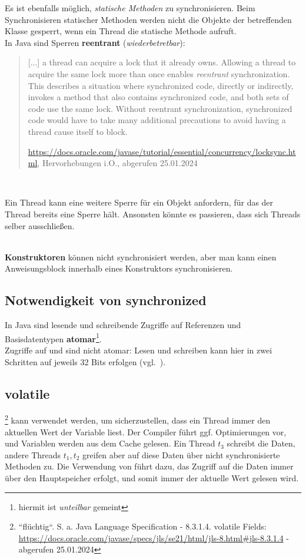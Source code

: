 Es ist ebenfalls möglich, \textit{statische Methoden} zu synchronisieren.
Beim Synchronisieren statischer Methoden werden nicht die Objekte der betreffenden Klasse gesperrt, wenn ein Thread die statische Methode aufruft.\\

In Java sind Sperren \textbf{reentrant} (\textit{wiederbetretbar}):

\blockquote[\url{https://docs.oracle.com/javase/tutorial/essential/concurrency/locksync.html}, Hervorhebungen i.O., abgerufen 25.01.2024]{
     [...] a thread can acquire a lock that it already owns. Allowing a thread to acquire the same lock more than once enables \textit{reentrant} synchronization. This describes a situation where synchronized code, directly or indirectly, invokes a method that also contains synchronized code, and both sets of code use the same lock. Without reentrant synchronization, synchronized code would have to take many additional precautions to avoid having a thread cause itself to block.
}\\

\begin{tcolorbox}
    Ein Thread kann eine weitere Sperre für ein Objekt anfordern, für das der Thread bereits eine Sperre hält.
    Ansonsten könnte es passieren, dass sich Threads selber ausschließen.
\end{tcolorbox}\\

\textbf{Konstruktoren} können nicht synchronisiert werden, aber man kann einen Anweisungsblock innerhalb eines Konstruktors synchronisieren.

\subsection*{Notwendigkeit von synchronized}

In Java sind lesende und schreibende Zugriffe auf Referenzen und Basisdatentypen \textbf{atomar}\footnote{
hiermit ist \textit{unteilbar} gemeint
}.\\

Zugriffe auf  und  sind nicht atomar: Lesen und schreiben kann hier in zwei Schritten auf jeweils 32 Bits erfolgen (vgl.~\cite[30]{Oec22}).\\

\subsection*{volatile}
\footnote{``flüchtig``.
S. a. Java Language Specification - 8.3.1.4. volatile Fields: \url{https://docs.oracle.com/javase/specs/jls/se21/html/jls-8.html#jls-8.3.1.4} - abgerufen 25.01.2024
} kann verwendet werden, um sicherzustellen, dass ein Thread immer den aktuellen Wert der Variable liest.
Der Compiler führt ggf. Optimierungen vor, und Variablen werden aus dem Cache gelesen.
Ein Thread $t_3$ schreibt die Daten, andere Threads $t_1, t_2$ greifen aber auf diese Daten über nicht synchronisierte Methoden zu.
Die Verwendung von  führt dazu, das Zugriff auf die Daten immer über den Hauptspeicher erfolgt, und somit immer der aktuelle Wert gelesen wird.

